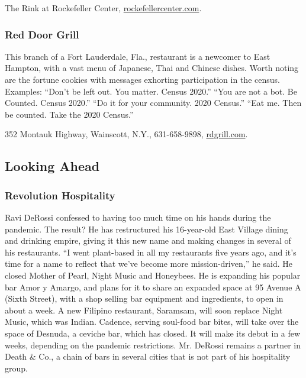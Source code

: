 The Rink at Rockefeller Center,
\href{https://www.rockefellercenter.com/}{rockefellercenter.com}.

\hypertarget{red-door-grill}{%
\subsubsection{Red Door Grill}\label{red-door-grill}}

This branch of a Fort Lauderdale, Fla., restaurant is a newcomer to East
Hampton, with a vast menu of Japanese, Thai and Chinese dishes. Worth
noting are the fortune cookies with messages exhorting participation in
the census. Examples: ``Don't be left out. You matter. Census 2020.''
``You are not a bot. Be Counted. Census 2020.'' ``Do it for your
community. 2020 Census.'' ``Eat me. Then be counted. Take the 2020
Census.''

352 Montauk Highway, Wainscott, N.Y., 631-658-9898,
\href{http://rdgrill.com/}{rdgrill.com}.

\hypertarget{looking-ahead}{%
\subsection{Looking Ahead}\label{looking-ahead}}

\hypertarget{revolution-hospitality}{%
\subsubsection{Revolution Hospitality}\label{revolution-hospitality}}

Ravi DeRossi confessed to having too much time on his hands during the
pandemic. The result? He has restructured his 16-year-old East Village
dining and drinking empire, giving it this new name and making changes
in several of his restaurants. ``I went plant-based in all my
restaurants five years ago, and it's time for a name to reflect that
we've become more mission-driven,'' he said. He closed Mother of Pearl,
Night Music and Honeybees. He is expanding his popular bar Amor y
Amargo, and plans for it to share an expanded space at 95 Avenue A
(Sixth Street), with a shop selling bar equipment and ingredients, to
open in about a week. A new Filipino restaurant, Saramsam, will soon
replace Night Music, which was Indian. Cadence, serving soul-food bar
bites, will take over the space of Desnuda, a ceviche bar, which has
closed. It will make its debut in a few weeks, depending on the pandemic
restrictions. Mr. DeRossi remains a partner in Death \& Co., a chain of
bars in several cities that is not part of his hospitality group.

